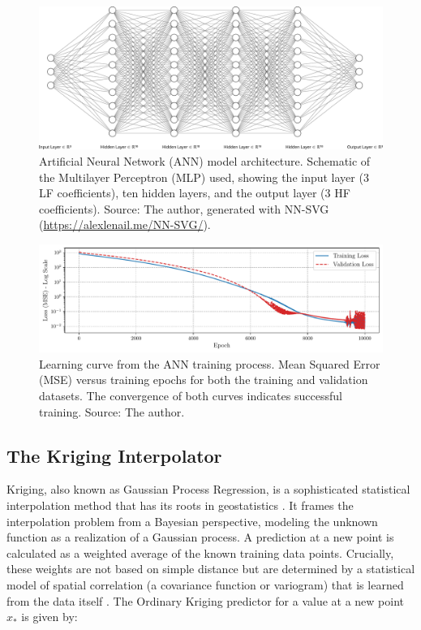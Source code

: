 \documentclass[tg, EN]{ufabcFHZh_tg}
\begin{document}
\begin{figure}[H]
    \centering
    \includegraphics[width=\textwidth]{Figuras/nn.pdf}
    \caption{Artificial Neural Network (ANN) model architecture. Schematic of the Multilayer Perceptron (MLP) used, showing the input layer (3 LF coefficients), ten hidden layers, and the output layer (3 HF coefficients). Source: The author, generated with NN-SVG (\url{https://alexlenail.me/NN-SVG/}).}
    \label{fig:ann_architecture}
\end{figure}

\begin{figure}[H]
    \centering
    \includegraphics[width=\textwidth]{Figuras/nn_loss.pdf}
    \caption{Learning curve from the ANN training process. Mean Squared Error (MSE) versus training epochs for both the training and validation datasets. The convergence of both curves indicates successful training. Source: The author.}
    \label{fig:ann_loss}
\end{figure}

\subsection{The Kriging Interpolator}

Kriging, also known as Gaussian Process Regression, is a sophisticated statistical interpolation method that has its roots in geostatistics \citep{rasmussen2006, sacks1989}. It frames the interpolation problem from a Bayesian perspective, modeling the unknown function as a realization of a Gaussian process. A prediction at a new point is calculated as a weighted average of the known training data points. Crucially, these weights are not based on simple distance but are determined by a statistical model of spatial correlation (a covariance function or variogram) that is learned from the data itself \citep{jones1998, ng2018}. The Ordinary Kriging predictor for a value at a new point $x_*$ is given by:
\end{document}
